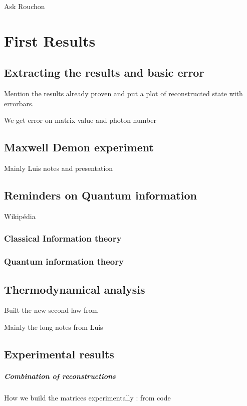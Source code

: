 \documentclass[10pt]{report}
\begin{document}
Ask Rouchon

\chapter{First Results}
\section{Extracting the results and basic error}

Mention the results already proven and put a plot of reconstructed state with errorbars.

We get error on matrix value and photon number

\section{Maxwell Demon experiment}

Mainly Luis notes and presentation


\section{Reminders on Quantum information}

Wikipédia

\subsection{Classical Information theory}

\subsection{Quantum information theory}

\section{Thermodynamical analysis}

Built the new second law from

Mainly the long notes from Luis


\section{Experimental results}

\paragraph{Combination of reconstructions} How we build the matrices
experimentally : from code
\end{document}
